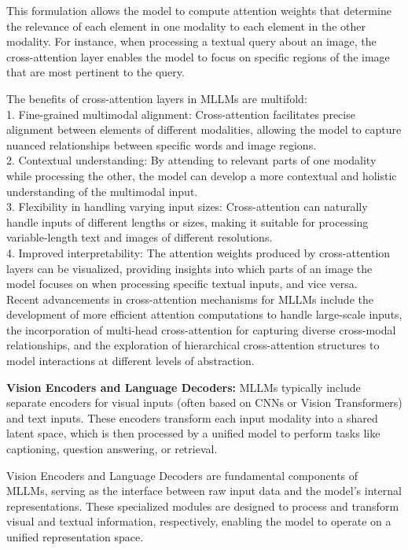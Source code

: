 This formulation allows the model to compute attention weights that determine the relevance of each element in one modality to each element in the other modality. For instance, when processing a textual query about an image, the cross-attention layer enables the model to focus on specific regions of the image that are most pertinent to the query.

The benefits of cross-attention layers in MLLMs are multifold:
\\
1. Fine-grained multimodal alignment: Cross-attention facilitates precise alignment between elements of different modalities, allowing the model to capture nuanced relationships between specific words and image regions.
\\
2. Contextual understanding: By attending to relevant parts of one modality while processing the other, the model can develop a more contextual and holistic understanding of the multimodal input.
\\
3. Flexibility in handling varying input sizes: Cross-attention can naturally handle inputs of different lengths or sizes, making it suitable for processing variable-length text and images of different resolutions.
\\
4. Improved interpretability: The attention weights produced by cross-attention layers can be visualized, providing insights into which parts of an image the model focuses on when processing specific textual inputs, and vice versa.
\\
Recent advancements in cross-attention mechanisms for MLLMs include the development of more efficient attention computations to handle large-scale inputs, the incorporation of multi-head cross-attention for capturing diverse cross-modal relationships, and the exploration of hierarchical cross-attention structures to model interactions at different levels of abstraction.

\textbf{Vision Encoders and Language Decoders:} MLLMs typically include separate encoders for visual inputs (often based on CNNs or Vision Transformers) and text inputs. These encoders transform each input modality into a shared latent space, which is then processed by a unified model to perform tasks like captioning, question answering, or retrieval.

Vision Encoders and Language Decoders are fundamental components of MLLMs, serving as the interface between raw input data and the model's internal representations. These specialized modules are designed to process and transform visual and textual information, respectively, enabling the model to operate on a unified representation space.

